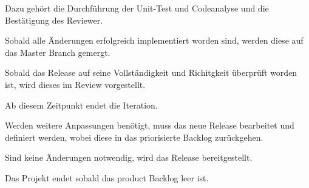 Dazu gehört die Durchführung der Unit-Test und Codeanalyse und die Bestätigung des Reviewer.

Sobald alle Änderungen erfolgreich implementiert worden sind, werden diese auf das Master Branch gemergt. 

Sobald das Release auf seine Vollständigkeit und Richitgkeit überprüft worden ist, wird dieses im Review vorgestellt. 

Ab diesem Zeitpunkt endet die Iteration. 

Werden weitere Anpassungen benötigt, muss das neue Release bearbeitet und definiert werden, wobei diese in das priorisierte Backlog zurückgehen.

Sind keine Änderungen notwendig, wird das Release bereitgestellt. 

Das Projekt endet sobald das product Backlog leer ist.















